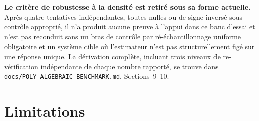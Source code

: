 \documentclass[11pt,a4paper]{article}
\begin{document}
\textbf{Le critère de robustesse à la densité est retiré sous sa forme
actuelle.} Après quatre tentatives indépendantes, toutes nulles ou de
signe inversé sous contrôle approprié, il n'a produit aucune preuve à
l'appui dans ce banc d'essai et n'est pas reconduit sans un bras de
contrôle par ré-échantillonnage uniforme obligatoire et un système cible
où l'estimateur n'est pas structurellement figé sur une réponse unique.
La dérivation complète, incluant trois niveaux de re-vérification
indépendante de chaque nombre rapporté, se trouve dans
\texttt{docs/POLY\_ALGEBRAIC\_BENCHMARK.md}, Sections~9--10.

\section{Limitations}
\label{sec:limitations}
\end{document}
